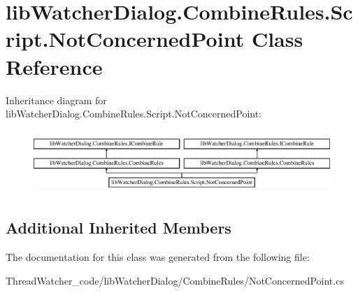 \hypertarget{classlib_watcher_dialog_1_1_combine_rules_1_1_script_1_1_not_concerned_point}{\section{lib\+Watcher\+Dialog.\+Combine\+Rules.\+Script.\+Not\+Concerned\+Point Class Reference}
\label{classlib_watcher_dialog_1_1_combine_rules_1_1_script_1_1_not_concerned_point}
}
Inheritance diagram for lib\+Watcher\+Dialog.\+Combine\+Rules.\+Script.\+Not\+Concerned\+Point\+:\begin{figure}[H]
\begin{center}
\leavevmode
\includegraphics[height=2.393162cm]{classlib_watcher_dialog_1_1_combine_rules_1_1_script_1_1_not_concerned_point}
\end{center}
\end{figure}
\subsection*{Additional Inherited Members}


The documentation for this class was generated from the following file\+:\begin{DoxyCompactItemize}
\item 
Thread\+Watcher\+\_\+code/lib\+Watcher\+Dialog/\+Combine\+Rules/Not\+Concerned\+Point.\+cs\end{DoxyCompactItemize}
